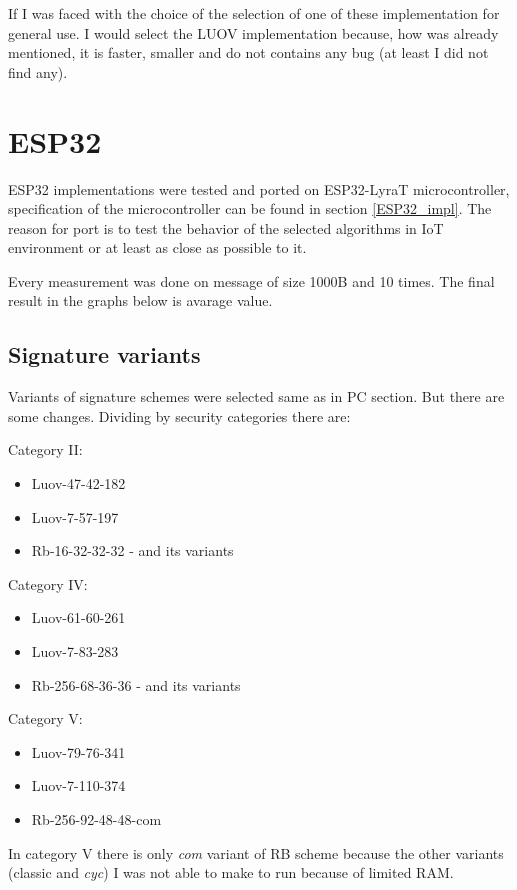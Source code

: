 \documentclass[thesis=M,english]{FITthesis}[2019/12/23]
\begin{document}
\bigskip
\noindent
If I was faced with the choice of the selection of one of these implementation for general use. I would select the LUOV implementation because, how was already mentioned, it is faster, smaller and do not contains any bug (at least I did not find any).

\newpage
\section{ESP32}
ESP32 implementations were tested and ported on ESP32-LyraT microcontroller, specification of the microcontroller can be found in section \ref{ESP32_impl}. The reason for port is to test the behavior of the selected algorithms in IoT environment or at least as close as possible to it.

\bigskip
\noindent
Every measurement was done on message of size 1000B and 10 times. The final result in the graphs below is avarage value.

\subsection{Signature variants}
Variants of signature schemes were selected same as in PC section. But there are some changes. Dividing by security categories there are:

\bigskip
\noindent
Category II:
\begin{itemize}
\item Luov-47-42-182
\item Luov-7-57-197
\item Rb-16-32-32-32 - and its variants
\end{itemize}

\noindent
Category IV:
\begin{itemize}
\item Luov-61-60-261
\item Luov-7-83-283
\item Rb-256-68-36-36 - and its variants
\end{itemize}

\noindent
Category V:
\begin{itemize}
\item Luov-79-76-341
\item Luov-7-110-374
\item Rb-256-92-48-48-com
\end{itemize}

\noindent
In category V there is only \textit{com} variant of RB scheme because the other variants (classic and \textit{cyc}) I was not able to make to run because of limited RAM.
\end{document}
